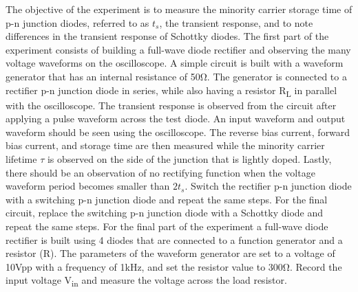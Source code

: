 The objective of the experiment is to measure the minority carrier storage time of p-n junction diodes, referred to as $t_s$, the transient response, and to note differences in the transient response of Schottky diodes. The first part of the experiment consists of building a full-wave diode rectifier and observing the many voltage waveforms on the oscilloscope. A simple circuit is built with a waveform generator that has an internal resistance of 50\si{\ohm}. The generator is connected to a rectifier p-n junction diode in series, while also having a resistor R\textsubscript{L} in parallel with the oscilloscope. The transient response is observed from the circuit after applying a pulse waveform across the test diode. An input waveform and output waveform should be seen using the oscilloscope. The reverse bias current, forward bias current, and storage time are then measured while the minority carrier lifetime $\tau$ is observed on the side of the junction that is lightly doped. Lastly, there should be an observation of no rectifying function when the voltage waveform period becomes smaller than $2t_s$. Switch the rectifier p-n junction diode with a switching p-n junction diode and repeat the same steps. For the final circuit, replace the switching p-n junction diode with a Schottky diode and repeat the same steps. For the final part of the experiment a full-wave diode rectifier is built using 4 diodes that are connected to a function generator and a resistor (R). The parameters of the waveform generator are set to a voltage of 10\si{\volt}pp with a frequency of 1\si{\kilo\hertz}, and set the resistor value to 300\si{\ohm}. Record the input voltage V\textsubscript{in} and measure the voltage across the load resistor. \\
